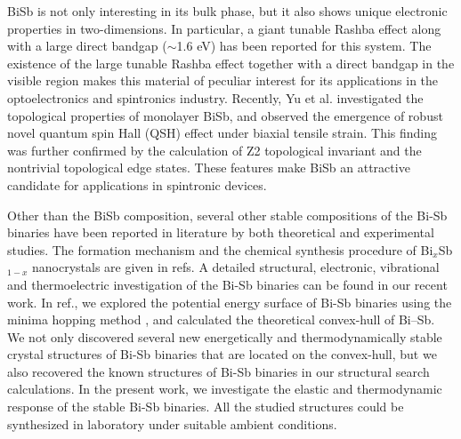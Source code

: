 \documentclass[twocolumn,superscriptaddress,nofootinbib,floatfix,aps,showpacs,prb,citeautoscript,reprint]{revtex4-1}
\begin{document}
BiSb is not only interesting in its bulk phase, but it also shows unique electronic properties in two-dimensions. \cite{Tan2017, Yu2017, MBrzezi2017, sobhitPRB_2DBiSb_monolayer} In particular, a giant tunable Rashba effect along with a large direct bandgap ($\sim$1.6 eV) has been reported for this system. \cite{sobhitPRB_2DBiSb_monolayer} The existence of the large tunable Rashba effect together with a direct bandgap in the visible region makes this material of peculiar interest for its applications in the optoelectronics and spintronics industry. Recently, Yu et al. \cite{Yu2017} investigated the topological properties of monolayer BiSb, and observed the emergence of robust novel quantum spin Hall (QSH) effect under biaxial tensile strain. This finding was further confirmed by the calculation of Z2 topological invariant and the nontrivial topological edge states. These features make BiSb an attractive candidate for applications in spintronic devices. 

Other than the BiSb composition, several other stable compositions of the Bi-Sb binaries have been reported in literature by both theoretical and experimental studies. \cite{LeePRB2014, singh2016PCCP, Gonzalo2006, dismukes1968lattice, Berger1982,  lenoir1996bi, YIM1972, BiSb-thermo1985, Lv2010} The formation mechanism and the chemical synthesis procedure of Bi$_{x}$Sb$_{1-x}$ nanocrystals are given in refs.\cite{Datta2011, Zhang2013, Kaspar2017}  A detailed structural, electronic, vibrational and thermoelectric investigation of the Bi-Sb binaries can be found in our recent work. \cite{singh2016PCCP} In ref.\cite{singh2016PCCP}, we explored the potential energy surface of Bi-Sb binaries using the minima hopping method \cite{Goedecker2004jpc, Amsler2010jpc}, and calculated the theoretical convex-hull of Bi--Sb. We not only discovered several new energetically and thermodynamically stable crystal structures of Bi-Sb binaries that are located on the convex-hull, but we also recovered the known structures of Bi-Sb binaries in our structural search calculations. In the present work, we investigate the elastic and thermodynamic response of the stable Bi-Sb binaries. All the studied structures could be synthesized in laboratory under suitable ambient conditions. \cite{Lv2010, singh2016PCCP, Datta2011, Zhang2013, Kaspar2017} 
\end{document}
